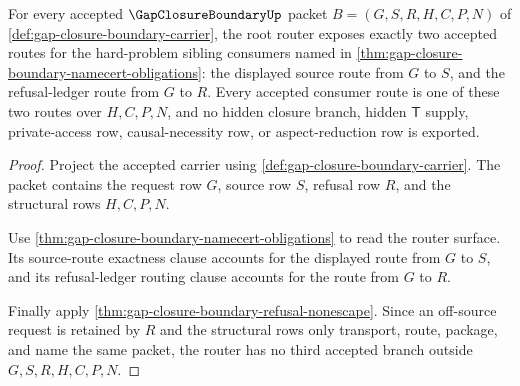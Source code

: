 \begin{theorem}
\label{thm:gap-closure-boundary-router-exactness}
For every accepted $\GapClosureBoundaryUp$ packet $B=(G,S,R,H,C,P,N)$ of \autoref{def:gap-closure-boundary-carrier}, the root router exposes exactly two accepted routes for the hard-problem sibling consumers named in \autoref{thm:gap-closure-boundary-namecert-obligations}: the displayed source route from $G$ to $S$, and the refusal-ledger route from $G$ to $R$. Every accepted consumer route is one of these two routes over $H,C,P,N$, and no hidden closure branch, hidden $\mathsf{T}$ supply, private-access row, causal-necessity row, or aspect-reduction row is exported.
\end{theorem}
\begin{proof}
Project the accepted carrier using \autoref{def:gap-closure-boundary-carrier}. The packet contains the request row $G$, source row $S$, refusal row $R$, and the structural rows $H,C,P,N$.

Use \autoref{thm:gap-closure-boundary-namecert-obligations} to read the router surface. Its source-route exactness clause accounts for the displayed route from $G$ to $S$, and its refusal-ledger routing clause accounts for the route from $G$ to $R$.

Finally apply \autoref{thm:gap-closure-boundary-refusal-nonescape}. Since an off-source request is retained by $R$ and the structural rows only transport, route, package, and name the same packet, the router has no third accepted branch outside $G,S,R,H,C,P,N$.
\end{proof}

